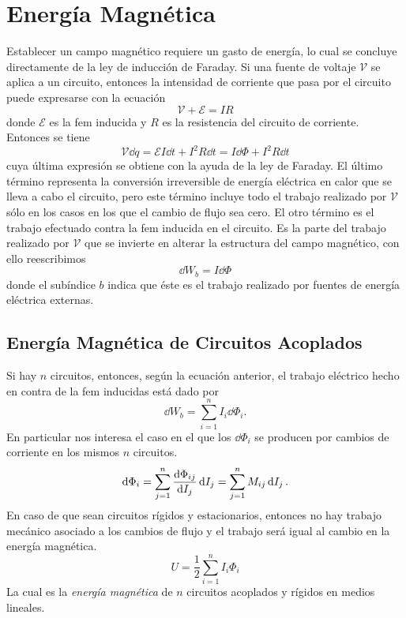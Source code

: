 \chapter{Energía Magnética}
Establecer un campo magnético requiere un gasto de energía, lo cual se concluye directamente de la ley de inducción de Faraday. Si una fuente de voltaje $\mathscr{V}$ se aplica a un circuito, entonces la intensidad de corriente que pasa por el circuito puede expresarse con la ecuación
\begin{equation}
    \mathscr{V} + \mathscr{E} = IR
\end{equation}
donde $\mathscr{E}$ es la fem inducida y $R$ es la resistencia del circuito de corriente. Entonces se tiene
\begin{equation}
    \mathscr{V} \dd{q} = \mathscr{E} I\dd{t} + I^2 R \dd{t} = I\dd{\Phi} + I^2 R \dd{t}
\end{equation}
cuya última expresión se obtiene con la ayuda de la ley de Faraday. El último término representa la conversión irreversible de energía eléctrica en calor que se lleva a cabo el circuito, pero este término incluye todo el trabajo realizado por $\mathscr{V}$ sólo en los casos en los que el cambio de flujo sea cero. El otro término es el trabajo efectuado contra la fem inducida en el circuito. Es la parte del trabajo realizado por $\mathscr{V}$ que se invierte en alterar la estructura del campo magnético, con ello reescribimos
\begin{equation}
    \dd{W}_b = I\dd{\Phi}
\end{equation}
donde el subíndice $b$ indica que éste es el trabajo realizado por fuentes de energía eléctrica externas. 


\section{Energía Magnética de Circuitos Acoplados}
Si hay $n$ circuitos, entonces, según la ecuación anterior, el trabajo eléctrico hecho en contra de la fem inducidas está dado por
\begin{equation}
    \dd{W}_b = \sum _{i=1} ^n I_i \dd{\Phi}_i.
\end{equation}
En particular nos interesa el caso en el que los $\dd{\Phi _i}$ se producen por cambios de corriente en los mismos $n$ circuitos.
\begin{equation}
    \dd{\Phi}_i = \sum _{j=1} ^n \dv{\Phi _{ij}}{I_j} \dd{I_j} = \sum _{j=1} ^n M_{ij} \dd{I_j}.
\end{equation}
En caso de que sean circuitos rígidos y estacionarios, entonces no hay trabajo mecánico asociado a los cambios de flujo y el trabajo será igual al cambio en la energía magnética.
\begin{equation}
    U = \frac{1}{2} \sum _{i=1} ^n I_i \Phi _i
\end{equation}
La cual es la \textit{energía magnética} de $n$ circuitos acoplados y rígidos en medios lineales.

